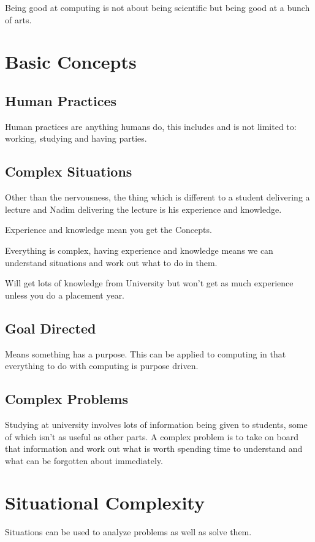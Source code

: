 
Being good at computing is not about being scientific but being good at a bunch of arts.

\section*{Basic Concepts}
\subsection*{Human Practices}
Human practices are anything humans do, this includes and is not limited to: working, studying and having parties.

\subsection*{Complex Situations}
Other than the nervousness, the thing which is different to a student delivering a lecture and Nadim delivering the lecture is his experience and knowledge.

Experience and knowledge mean you get the Concepts.

Everything is complex, having experience and knowledge means we can understand situations and work out what to do in them.

Will get lots of knowledge from University but won't get as much experience unless you do a placement year.

\subsection*{Goal Directed}
Means something has a purpose. This can be applied to computing in that everything to do with computing is purpose driven. 

\subsection*{Complex Problems}
Studying at university involves lots of information being given to students, some of which isn't as useful as other parts. A complex problem is to take on board that information and work out what is worth spending time to understand and what can be forgotten about immediately.

\section*{Situational Complexity}
Situations can be used to analyze problems as well as solve them.

